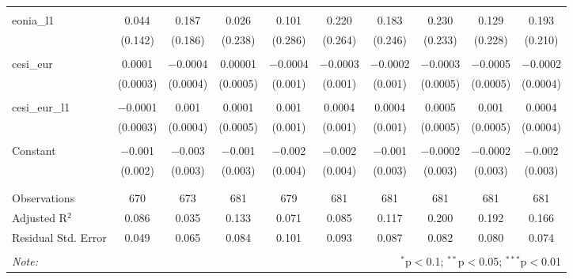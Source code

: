 \begin{table}[!htbp]
\begin{adjustbox}{width=1.35\textwidth}
\begin{tabular}{@{\extracolsep{5pt}}lccccccccc}
  & & & & & & & & & \\ 
 eonia\_l1 & 0.044 & 0.187 & 0.026 & 0.101 & 0.220 & 0.183 & 0.230 & 0.129 & 0.193 \\ 
  & (0.142) & (0.186) & (0.238) & (0.286) & (0.264) & (0.246) & (0.233) & (0.228) & (0.210) \\ 
  & & & & & & & & & \\ 
 cesi\_eur & 0.0001 & $-$0.0004 & 0.00001 & $-$0.0004 & $-$0.0003 & $-$0.0002 & $-$0.0003 & $-$0.0005 & $-$0.0002 \\ 
  & (0.0003) & (0.0004) & (0.0005) & (0.001) & (0.001) & (0.001) & (0.0005) & (0.0005) & (0.0004) \\ 
  & & & & & & & & & \\ 
 cesi\_eur\_l1 & $-$0.0001 & 0.001 & 0.0001 & 0.001 & 0.0004 & 0.0004 & 0.0005 & 0.001 & 0.0004 \\ 
  & (0.0003) & (0.0004) & (0.0005) & (0.001) & (0.001) & (0.001) & (0.0005) & (0.0005) & (0.0004) \\ 
  & & & & & & & & & \\ 
 Constant & $-$0.001 & $-$0.003 & $-$0.001 & $-$0.002 & $-$0.002 & $-$0.001 & $-$0.0002 & $-$0.0002 & $-$0.002 \\ 
  & (0.002) & (0.003) & (0.003) & (0.004) & (0.004) & (0.003) & (0.003) & (0.003) & (0.003) \\ 
  & & & & & & & & & \\ 
\hline \\[-1.8ex] 
Observations & 670 & 673 & 681 & 679 & 681 & 681 & 681 & 681 & 681 \\ 
Adjusted R$^{2}$ & 0.086 & 0.035 & 0.133 & 0.071 & 0.085 & 0.117 & 0.200 & 0.192 & 0.166 \\ 
Residual Std. Error & 0.049 & 0.065 & 0.084 & 0.101 & 0.093 & 0.087 & 0.082 & 0.080 & 0.074 \\ 
\hline 
\hline \\[-1.8ex] 
\textit{Note:}  & \multicolumn{9}{r}{$^{*}$p$<$0.1; $^{**}$p$<$0.05; $^{***}$p$<$0.01} \\ 
\end{tabular} 
\end{adjustbox}
\end{table} 
